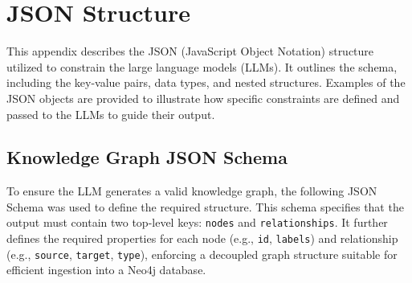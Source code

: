 \chapter{JSON Structure}
\label{app:json_structure}

This appendix describes the JSON (JavaScript Object Notation) structure utilized to constrain the large language models (LLMs). It outlines the schema, including the key-value pairs, data types, and nested structures. Examples of the JSON objects are provided to illustrate how specific constraints are defined and passed to the LLMs to guide their output.

\section{Knowledge Graph JSON Schema}

To ensure the LLM generates a valid knowledge graph, the following JSON Schema was used to define the required structure. This schema specifies that the output must contain two top-level keys: \texttt{nodes} and \texttt{relationships}. It further defines the required properties for each node (e.g., \texttt{id}, \texttt{labels}) and relationship (e.g., \texttt{source}, \texttt{target}, \texttt{type}), enforcing a decoupled graph structure suitable for efficient ingestion into a Neo4j database.

